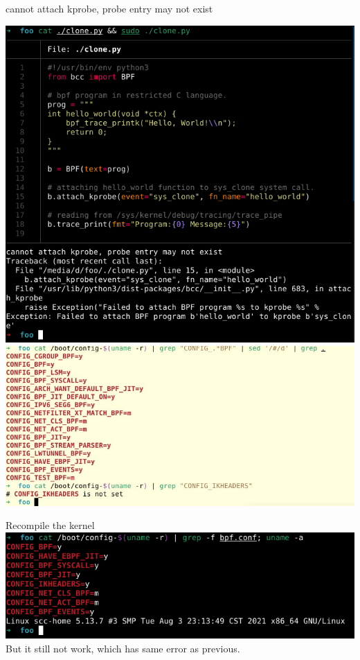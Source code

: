 \documentclass{beamer}
\begin{document}
\begin{CJK*}{UTF8}{bsmi}
  \begin{frame}{cannot attach kprobe, probe entry may not exist}
    \begin{multicols*}{2}
      \includegraphics[width=.7\textwidth]{Qbrd44D.png}
      \includegraphics[width=.5\textwidth]{yEC8xkQ.png}
    \end{multicols*}
  \end{frame}


  \begin{frame}{Recompile the kernel}
    \includegraphics[width=\textwidth]{7OTOHXg.png}\\
    But it still not work, which has same error as previous.
  \end{frame}


\end{CJK*}
\end{document}
